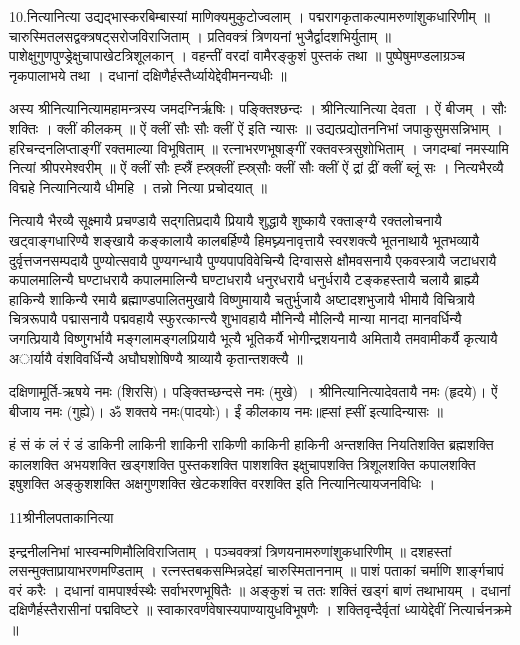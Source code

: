 10.नित्यानित्या
उद्यद्भास्करबिम्बास्यां माणिक्यमुकुटोज्वलाम् । पद्मरागकृताकल्पामरुणांशुकधारिणीम् ॥
चारुस्मितलसद्वक्त्रषट्सरोजविराजिताम् । प्रतिवक्त्रं त्रिणयनां भुजैर्द्वादशभिर्युताम् ॥
पाशेक्षुगुणपुण्ड्रेक्षुचापाखेटत्रिशूलकान् । वहन्तीं वरदां वामैरङ्कुशं पुस्तकं तथा ॥
पुष्पेषुमण्डलाग्रञ्च नृकपालाभये तथा । दधानां दक्षिणैर्हस्तैर्ध्यायेद्देवीमनन्यधीः ॥


अस्य श्रीनित्यानित्यामहामन्त्रस्य जमदग्निर्ऋषिः। पङ्क्तिश्छन्दः । श्रीनित्यानित्या देवता । ऐं बीजम् । सौः शक्तिः । क्लीं कीलकम् ॥
ऐं क्लीं सौः सौः क्लीं ऐं  इति न्यासः ॥
उद्यत्प्रद्योतननिभां जपाकुसुमसन्निभाम् । हरिचन्दनलिप्ताङ्गीं रक्तमाल्या विभूषिताम् ॥
रत्नाभरणभूषाङ्गीं रक्तवस्त्रसुशोभिताम् । जगदम्बां नमस्यामि नित्यां श्रीपरमेश्वरीम् ॥
ऐं क्लीं सौः ह्स्रैं ह्स्र्क्लीं ह्स्र्सौः क्लीं सौः क्लीं ऐं द्रां द्रीं क्लीं ब्लूं सः ।
नित्यभैरव्यै विद्महे नित्यानित्यायै धीमहि । तन्नो नित्या प्रचोदयात् ॥

नित्यायै भैरव्यै सूक्ष्मायै प्रचण्डायै सद्गतिप्रदायै प्रियायै शुद्धायै शुष्कायै रक्ताङ्ग्यै रक्तलोचनायै खट्वाङ्गधारिण्यै शङ्खायै कङ्कालायै कालबर्हिण्यै हिमघ्न्यनावृत्तायै स्वरशक्त्यै 
भूतनाथायै भूतभव्यायै दुर्वृत्तजनसम्पदायै पुण्योत्सवायै पुण्यगन्धायै पुण्यपापविवेचिन्यै दिग्वाससे क्षौमवसनायै एकवस्त्रायै जटाधरायै कपालमालिन्यै घण्टाधरायै कपालमालिन्यै घण्टाधरायै धनुरधरायै धनुर्धरायै टङ्कहस्तायै चलायै ब्राह्म्यै हाकिन्यै शाकिन्यै रमायै ब्रह्माण्डपालितमुखायै विष्णुमायायै चतुर्भुजायै अष्टादशभुजायै भीमायै विचित्रायै चित्ररूपायै पद्मासनायै पद्मवहायै स्फुरत्कान्त्यै शुभावहायै मौनिन्यै मौलिन्यै मान्या मानदा मानवर्धिन्यै जगत्प्रियायै विष्णुगर्भायै मङ्गलामङ्गलप्रियायै भूत्यै भूतिकर्यै भोगीन्द्रशयनायै अमितायै तमवामीकर्यै कृत्यायै अार्यायै वंशविवर्धिन्यै अघौघशोषिण्यै श्राव्यायै कृतान्तशक्त्यै ॥

दक्षिणामूर्ति-ऋषये नमः (शिरसि)। पङ्क्तिच्छन्दसे नमः (मुखे)~। श्रीनित्यानित्यादेवतायै नमः (हृदये)। ऐं बीजाय नमः (गुह्ये)। ॐ शक्तये नमः(पादयोः)।
ईं  कीलकाय नमः॥ह्सां ह्सीं इत्यादिन्यासः ॥

हं सं कं लं रं डं 
डाकिनी लाकिनी शाकिनी राकिणी काकिनी हाकिनी अन्तशक्ति नियतिशक्ति ब्रह्मशक्ति कालशक्ति अभयशक्ति खड्गशक्ति पुस्तकशक्ति पाशशक्ति इक्षुचापशक्ति त्रिशूलशक्ति कपालशक्ति इषुशक्ति अङ्कुशशक्ति अक्षगुणशक्ति खेटकशक्ति वरशक्ति 
इति नित्यानित्यायजनविधिः ।

11श्रीनीलपताकानित्या

इन्द्रनीलनिभां भास्वन्मणिमौलिविराजिताम् । पञ्चवक्त्रां त्रिणयनामरुणांशुकधारिणीम् ॥
दशहस्तां लसन्मुक्ताप्रायाभरणमण्डिताम् । रत्नस्तबकसम्भिन्नदेहां चारुस्मिताननाम् ॥
पाशं पताकां चर्माणि शार्ङ्गचापं वरं करैः । दधानां वामपार्श्वस्थैः सर्वाभरणभूषितैः ॥
अङ्कुशं च ततः शक्तिं खड्गं बाणं तथाभायम् । दधानां दक्षिणैर्हस्तैरासीनां पद्मविष्टरे ॥
स्वाकारवर्णवेषास्यपाण्यायुधविभूषणैः । शक्तिवृन्दैर्वृतां ध्यायेद्देवीं नित्यार्चनक्रमे ॥

